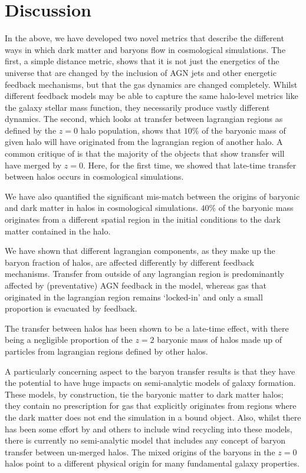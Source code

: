 \section{Discussion}
\label{sec:conclusions}

In the above, we have developed two novel metrics that describe the different
ways in which dark matter and baryons flow in cosmological simulations. The
first, a simple distance metric, shows that it is not just the energetics of
the universe that are changed by the inclusion of AGN jets and other energetic
feedback mechanisms, but that the gas dynamics are changed completely. Whilst
different feedback models may be able to capture the same halo-level metrics
like the galaxy stellar mass function, they necessarily produce vastly
different dynamics. The second, which looks at transfer between lagrangian
regions as defined by the $z=0$ halo population, shows that $10\%$ of the
baryonic mass of given halo will have originated from the lagrangian region
of another halo. A common critique of \citet{AnglesAlcazar2017} is that the
majority of the objects that show transfer will have merged by $z=0$. Here,
for the first time, we showed that late-time transfer between halos occurs
in cosmological simulations.

We have also quantified the significant mis-match between the origins of
baryonic and dark matter in halos in cosmological simulations. $40\%$ of the
baryonic mass originates from a different spatial region in the initial
conditions to the dark matter contained in the halo.

We have shown that different lagrangian components, as they make up the
baryon fraction of halos, are affected differently by different feedback
mechanisms. Transfer from outside of any lagrangian region is predominantly
affected by (preventative) AGN feedback in the \simba{} model, whereas gas
that originated in the lagrangian region remains `locked-in' and only a small
proportion is evacuated by feedback.

The transfer between halos has been shown to be a late-time effect, with
there being a negligible proportion of the $z=2$ baryonic mass of halos
made up of particles from lagrangian regions defined by other halos.

A particularly concerning aspect to the baryon transfer results is that they
have the potential to have huge impacts on semi-analytic models of galaxy
formation. These models, by construction, tie the baryonic matter to dark
matter halos; they contain no prescription for gas that explicitly originates
from regions where the dark matter does not end the simulation in a bound
object. Also, whilst there has been some effort by \citet{Henriques2015} and
others to include wind recycling into these models, there is currently
no semi-analytic model that includes any concept of baryon transfer between
un-merged halos. The mixed origins of the baryons in the $z=0$ halos
point to a different physical origin for many fundamental galaxy properties.

